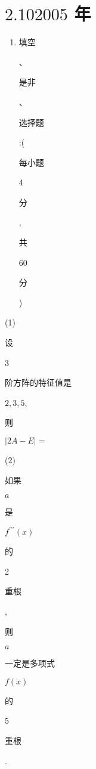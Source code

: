 \documentclass[10pt]{article}
\begin{document}
\section{$2.102005$ 年}
\begin{enumerate}
  \item \begin{CJK}{UTF8}{mj}填空\end{CJK}、\begin{CJK}{UTF8}{mj}是非\end{CJK}、\begin{CJK}{UTF8}{mj}选择题\end{CJK}:(\begin{CJK}{UTF8}{mj}每小题\end{CJK} 4 \begin{CJK}{UTF8}{mj}分\end{CJK}, \begin{CJK}{UTF8}{mj}共\end{CJK} 60 \begin{CJK}{UTF8}{mj}分\end{CJK})
\end{enumerate}
(1) \begin{CJK}{UTF8}{mj}设\end{CJK} 3 \begin{CJK}{UTF8}{mj}阶方阵的特征值是\end{CJK} $2,3,5$, \begin{CJK}{UTF8}{mj}则\end{CJK} $|2 A-E|=$

(2) \begin{CJK}{UTF8}{mj}如果\end{CJK} $a$ \begin{CJK}{UTF8}{mj}是\end{CJK} $f^{\prime \prime \prime}(x)$ \begin{CJK}{UTF8}{mj}的\end{CJK} 2 \begin{CJK}{UTF8}{mj}重根\end{CJK}, \begin{CJK}{UTF8}{mj}则\end{CJK} $a$ \begin{CJK}{UTF8}{mj}一定是多项式\end{CJK} $f(x)$ \begin{CJK}{UTF8}{mj}的\end{CJK} 5 \begin{CJK}{UTF8}{mj}重根\end{CJK}.
\end{document}
